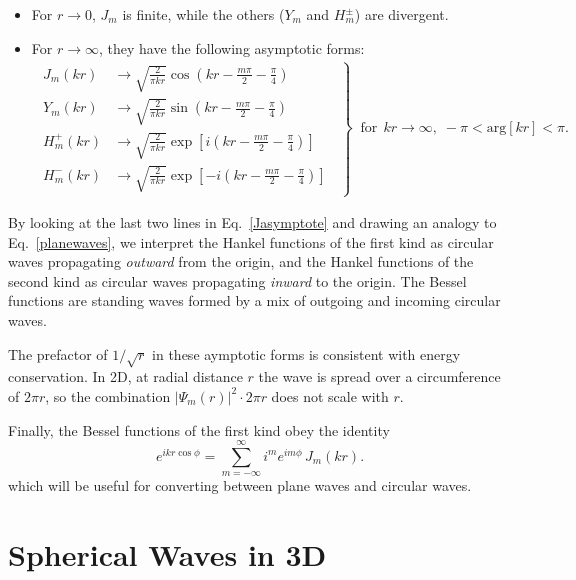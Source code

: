 \documentclass[pra,12pt]{revtex4}
\begin{document}
\begin{itemize}
\item For $r \rightarrow 0$, $J_m$ is finite, while the others ($Y_m$ and
$H_m^\pm$) are divergent.

\item For $r \rightarrow \infty$, they have the following asymptotic forms:
\begin{align}
  \left.
  \begin{aligned}
    J_m(kr) &\rightarrow
    \sqrt{\frac{2}{\pi kr}} \cos\!\left(kr - \frac{m\pi}{2} - \frac{\pi}{4}\right) \\
    Y_m(kr) &\rightarrow
    \sqrt{\frac{2}{\pi kr}} \sin\!\left(kr - \frac{m\pi}{2} - \frac{\pi}{4}\right) \\
    H_m^+(kr) &\rightarrow
    \sqrt{\frac{2}{\pi kr}}
    \exp\left[i\left(kr - \frac{m\pi}{2} - \frac{\pi}{4}\right)\right] \\
    H_m^-(kr) &\rightarrow
    \sqrt{\frac{2}{\pi kr}}
    \exp\left[-i\left(kr - \frac{m\pi}{2} - \frac{\pi}{4}\right)\right]
  \end{aligned}\;\;
  \right\}
  \;\; \text{for}\;\, kr \rightarrow \infty,\;
  -\pi < \mathrm{arg}[kr] < \pi.
  \label{Jasymptote}
\end{align}
\end{itemize}

By looking at the last two lines in Eq.~\eqref{Jasymptote} and drawing
an analogy to Eq.~\eqref{planewaves}, we interpret the Hankel
functions of the first kind as circular waves propagating
\textit{outward} from the origin, and the Hankel functions of the
second kind as circular waves propagating \textit{inward} to the
origin.  The Bessel functions are standing waves formed by a mix of
outgoing and incoming circular waves.

The prefactor of $1/\sqrt{r}$ in these aymptotic forms is consistent
with energy conservation.  In 2D, at radial distance $r$ the wave is
spread over a circumference of $2\pi r$, so the combination
$|\Psi_m(r)|^2 \cdot 2\pi r$ does not scale with $r$.

Finally, the Bessel functions of the first kind obey the identity
\begin{equation}
  e^{ikr\cos\phi} = \sum_{m=-\infty}^\infty i^m e^{im\phi} \, J_m(kr).
  \label{eikrcosphi}
\end{equation}
which will be useful for converting between plane waves and circular
waves.

\section{Spherical Waves in 3D}
\label{sec:spherical}
\end{document}
